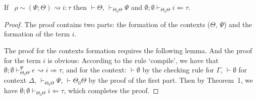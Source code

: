 \documentclass{sig-alternate}[10pt]
\begin{document}
\begin{theorem}[Compilation]
If ~$\rho\sim(\Psi;\Theta)\rightsquigarrow i:\tau$ then $\vdash\Theta$, $\vdash_{\Theta_0\Theta}\Psi$ and $\emptyset;\emptyset\vdash_{\Theta_0\Theta} i\Leftarrow\tau$.
\end{theorem}
\begin{proof}
The proof contains two parts: the formation of the contexts ($\Theta$, $\Psi$) and the formation of the term $i$.

The proof for the contexts formation requires the following lemma. And the proof for the term $i$ is obvious: According to the rule `compile', we have that $\emptyset;\emptyset\vdash_{\Theta_0\Theta}^{\Psi}e\rightsquigarrow i\Rightarrow \tau$, and for the context: $\vdash\emptyset$ by the checking rule for $\Gamma$, $\vdash\emptyset$ for context $\Delta$, $\vdash_{\Theta_0\Theta}\Psi$, $\vdash\Theta_0\Theta$ by the proof of the first part. Then by Theorem~1, we have $\emptyset;\emptyset\vdash_{\Theta_0\Theta}i\Leftarrow\tau$, which completes the proof.
\end{proof}
\end{document}
